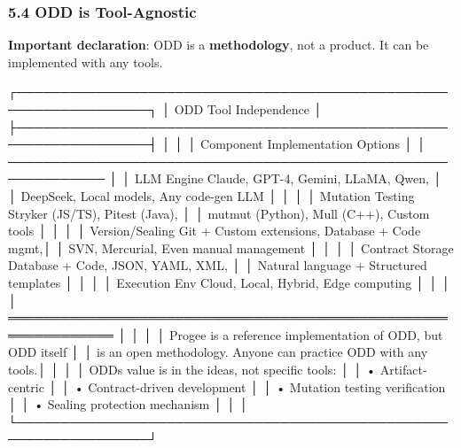 \documentclass[
]{article}
\newenvironment{Shaded}{}{}
\newcommand{\NormalTok}[1]{#1}
\begin{document}
\hypertarget{54-odd-is-tool-agnostic}{%
\subsubsection{5.4 ODD is Tool-Agnostic}\label{54-odd-is-tool-agnostic}}

\textbf{Important declaration}: ODD is a \textbf{methodology}, not a
product. It can be implemented with any tools.

\begin{Shaded}
\begin{Highlighting}[]
\NormalTok{┌─────────────────────────────────────────────────────────────────┐}
\NormalTok{│                    ODD Tool Independence                         │}
\NormalTok{├─────────────────────────────────────────────────────────────────┤}
\NormalTok{│                                                                  │}
\NormalTok{│  Component         Implementation Options                        │}
\NormalTok{│  ─────────────────────────────────────────────────────────────  │}
\NormalTok{│  LLM Engine        Claude, GPT{-}4, Gemini, LLaMA, Qwen,          │}
\NormalTok{│                    DeepSeek, Local models, Any code{-}gen LLM     │}
\NormalTok{│                                                                  │}
\NormalTok{│  Mutation Testing  Stryker (JS/TS), Pitest (Java),              │}
\NormalTok{│                    mutmut (Python), Mull (C++), Custom tools    │}
\NormalTok{│                                                                  │}
\NormalTok{│  Version/Sealing   Git + Custom extensions, Database + Code mgmt,│}
\NormalTok{│                    SVN, Mercurial, Even manual management       │}
\NormalTok{│                                                                  │}
\NormalTok{│  Contract Storage  Database + Code, JSON, YAML, XML,            │}
\NormalTok{│                    Natural language + Structured templates      │}
\NormalTok{│                                                                  │}
\NormalTok{│  Execution Env     Cloud, Local, Hybrid, Edge computing         │}
\NormalTok{│                                                                  │}
\NormalTok{│  ══════════════════════════════════════════════════════════════  │}
\NormalTok{│                                                                  │}
\NormalTok{│  Progee is a reference implementation of ODD, but ODD itself    │}
\NormalTok{│  is an open methodology. Anyone can practice ODD with any tools.│}
\NormalTok{│                                                                  │}
\NormalTok{│  ODD\textquotesingle{}s value is in the ideas, not specific tools:               │}
\NormalTok{│  • Artifact{-}centric                                             │}
\NormalTok{│  • Contract{-}driven development                                  │}
\NormalTok{│  • Mutation testing verification                                │}
\NormalTok{│  • Sealing protection mechanism                                 │}
\NormalTok{│                                                                  │}
\NormalTok{└─────────────────────────────────────────────────────────────────┘}
\end{Highlighting}
\end{Shaded}
\end{document}

